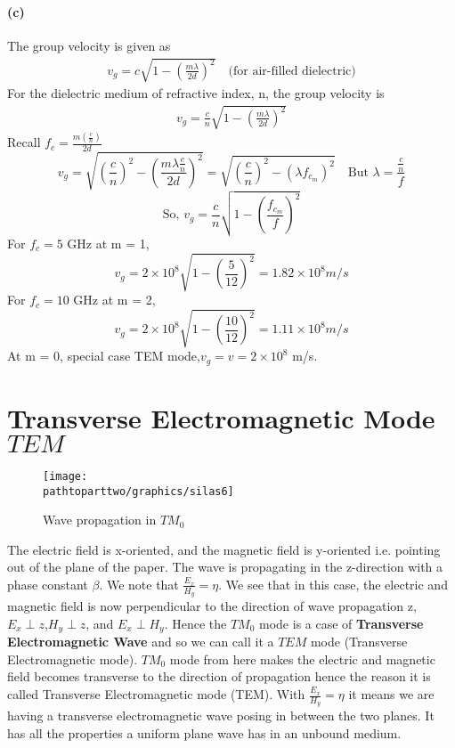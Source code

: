 \begin{exmp}
\paragraph{(c)} The group velocity is given as
\begin{align*}
v_g = c\sqrt{1 - \left(\frac{m\lambda}{2d}\right)^2}\quad\text{(for air-filled dielectric)}
\end{align*}
For the dielectric medium of refractive index, n, the group velocity is
\begin{align*}
v_g = \frac{c}{n}\sqrt{1 - \left(\frac{m\lambda}{2d}\right)^2}
\end{align*}
Recall $f_c = \frac{m\left(\frac{c}{n}\right)}{2d}$
\begin{dmath*}
v_g = \sqrt{\left(\frac{c}{n}\right)^2 - \left(\frac{m\lambda\frac{c}{n}}{2d}\right)^2}
= \sqrt{\left(\frac{c}{n}\right)^2 - (\lambda f_{c_m})^2}\quad\text{But $\lambda = \frac{\frac{c}{n}}{f}$}
\end{dmath*}
\begin{dmath}
\text{So, }v_g = \frac{c}{n}\sqrt{1 - \left(\frac{f_{c_m}}{f}\right)^2}
\label{eqn:grpvel3}
\end{dmath}
For $f_c = 5$ GHz at m = 1,
\begin{dmath*}
v_g = 2\times10^8\sqrt{1 - \left(\frac{5}{12}\right)^2} = 1.82\times10^8 m/s
\end{dmath*}
For $f_{c} = 10$ GHz at m = 2,
\begin{dmath*}
v_g = 2\times10^8\sqrt{1 - \left(\frac{10}{12}\right)^2} = 1.11\times10^8 m/s
\end{dmath*}
At m = 0, special case TEM mode,$v_g = v = 2\times10^8$ m/s.
\end{exmp}

\section{Transverse Electromagnetic Mode $TEM$}
\begin{figure}[h]
\centering
\texttt{[image: \\pathtoparttwo/graphics/silas6]}
\caption{Wave propagation in $TM_0$}
\label{fig:silas6}
\end{figure}
The electric field is x-oriented, and the magnetic field is y-oriented i.e. pointing out of the plane of the paper. The wave is propagating in the z-direction with a phase constant $\beta$. We note that $\frac{E_{x}}{H_{y}} = \eta$. We see that in this case, the electric and magnetic field is now perpendicular to the direction of wave propagation z, $E_{x}\perp z$,$H_{y}\perp z$, and $E_{x}\perp H_{y}$. Hence the $TM_0$ mode is a case of \textbf{Transverse Electromagnetic Wave} and so we can call it a $TEM$ mode (Transverse Electromagnetic mode). $TM_0$ mode from here makes the electric and magnetic field becomes transverse to the direction of propagation hence the reason it is called Transverse Electromagnetic mode (TEM). With $\frac{E_{x}}{H_{y}} = \eta$ it means we are having a transverse electromagnetic wave posing in between the two planes. It has all the properties a uniform plane wave has in an unbound medium.

